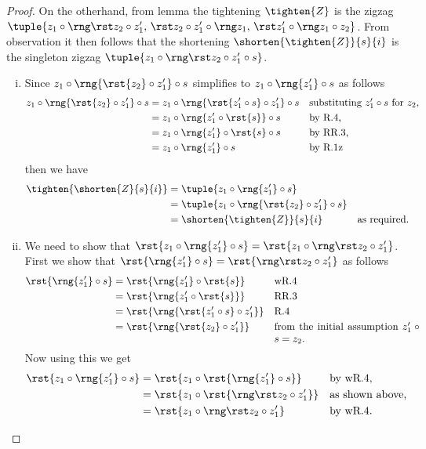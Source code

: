 {\begin{proof}
On the otherhand, from  lemma 
the tightening $\tighten{Z}$ is the zigzag
$\tuple{ \tighteningOne,\,\tighteningTwo,\,\tighteningThree}$.
From observation 
it then follows that the shortening $\shorten{\tighten{Z}}{s}{i}$
is the singleton zigzag $\tuple{\tighteningOne \circ s}$.
\begin{enumerate}[(i)]
\item %
Since $z_1 \circ \rng{\rst{z_2} \circ z'_1} \circ s$ 
simplifies to $z_1 \circ \rng{z'_1} \circ s$ as follows
\begin{align*}
 z_1 \circ \rng{\rst{z_2} \circ z'_1} \circ s
           &= z_1 \circ \rng{\rst{z'_1 \circ s} \circ z'_1} \circ s
           && \mbox{substituting $z'_1 \circ s$ for $z_2$,} \\
           &= z_1 \circ \rng{z'_1 \circ \rst{s}} \circ s 
           && \mbox{by R.4,} \\
           &= z_1 \circ \rng{z'_1} \circ \rst{s} \circ s
           && \mbox{by RR.3,} \\
           &= z_1 \circ \rng{z'_1} \circ s
           && \mbox{by R.1z} 
\end{align*}
then we have
\begin{align*}
\tighten{\shorten{Z}{s}{i}}
            &= \tuple{ z_1 \circ \rng{z'_1} \circ s } \\
            &= \tuple{
                       z_1 \circ \rng{\rst{z_2} \circ z'_1} \circ s
                     } \\
            &= \shorten{\tighten{Z}}{s}{i} &&\mbox{as required.}
\end{align*}  
\item %
We need to show that 
$\rst{z_1 \circ \rng{z'_1} \circ s}= \rst{z_1 \circ \rngTightenerOne{z}}$.
First we show that 
$\rst{\rng{z'_1} \circ s}=\rst{\rngTightenerOne{z}}$
as follows
\begin{align*}
\rst{\rng{z'_1} \circ s} 
    &= \rst{\rng{z'_1} \circ \rst{s}} && \mbox{wR.4}\\
    &= \rst{ \rng{ z'_1 \circ \rst{s} } }
                                      && \mbox{RR.3} \\
    &= \rst{ \rng{ \rst{z'_1 \circ s} \circ z'_1 } }
                                      && \mbox{R.4} \\
        &= \rst{ \rng{ \rst{z_2} \circ z'_1 } }
                        && \parbox[t]{5cm}{from the initial assumption 
                        $z'_1 \circ s = z_2$.} 
\end{align*}
Now using this we get
\begin{align*}
\rst{z_1 \circ \rng{z'_1} \circ s} 
                &=\rst{z_1 \circ \rst{\rng{z'_1} \circ s}} 
                &&\mbox{by wR.4,}\\
                &=\rst{z_1 \circ \rst{\rngTightenerOne{z}}}
                && \mbox{as shown above,}\\
                &= \rst{z_1 \circ \rngTightenerOne{z}}
                &&\mbox{by wR.4.}
\end{align*}


\end{enumerate}
\end{proof}}
